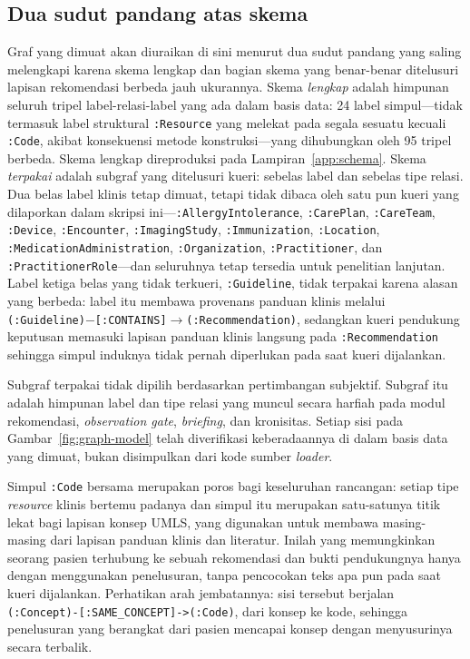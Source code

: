 \subsection{Dua sudut pandang atas skema}
Graf yang dimuat akan diuraikan di sini menurut dua sudut pandang yang saling melengkapi karena skema
lengkap dan bagian skema yang benar-benar ditelusuri lapisan rekomendasi berbeda jauh
ukurannya. Skema \emph{lengkap} adalah himpunan seluruh tripel label-relasi-label yang ada
dalam basis data: 24 label simpul---tidak termasuk label struktural \texttt{:Resource} yang
melekat pada segala sesuatu kecuali \texttt{:Code}, akibat konsekuensi metode konstruksi---yang dihubungkan
oleh 95 tripel berbeda. Skema lengkap direproduksi pada Lampiran~\ref{app:schema}. Skema
\emph{terpakai} adalah subgraf yang ditelusuri kueri: sebelas label dan sebelas tipe relasi. Dua belas
label klinis tetap dimuat, tetapi tidak dibaca oleh satu pun kueri yang dilaporkan dalam
skripsi ini---\texttt{:AllergyIntolerance}, \texttt{:CarePlan}, \texttt{:CareTeam},
\texttt{:Device}, \texttt{:Encounter}, \texttt{:ImagingStudy}, \texttt{:Immunization},
\texttt{:Location}, \texttt{:MedicationAdministration}, \texttt{:Organization},
\texttt{:Practitioner}, dan \texttt{:PractitionerRole}---dan seluruhnya tetap tersedia untuk
penelitian lanjutan. Label ketiga belas yang tidak terkueri, \texttt{:Guideline}, tidak
terpakai karena alasan yang berbeda: label itu membawa provenans panduan klinis melalui
\texttt{(:Guideline)$-$[:CONTAINS]$\rightarrow$(:Recommendation)}, sedangkan kueri pendukung
keputusan memasuki lapisan panduan klinis langsung pada \texttt{:Recommendation} sehingga simpul
induknya tidak pernah diperlukan pada saat kueri dijalankan.

Subgraf terpakai tidak dipilih berdasarkan pertimbangan subjektif. Subgraf itu adalah himpunan
label dan tipe relasi yang muncul secara harfiah pada modul rekomendasi,
\emph{observation gate}, \emph{briefing}, dan kronisitas. Setiap sisi pada Gambar~\ref{fig:graph-model} telah diverifikasi keberadaannya di dalam basis data yang dimuat,
bukan disimpulkan dari kode sumber \emph{loader}.

Simpul \texttt{:Code} bersama merupakan poros bagi keseluruhan rancangan: setiap tipe \emph{resource}
klinis bertemu padanya dan simpul itu merupakan satu-satunya titik lekat bagi lapisan konsep
UMLS, yang digunakan untuk membawa masing-masing dari lapisan panduan klinis dan literatur. Inilah yang memungkinkan
seorang pasien terhubung ke sebuah rekomendasi dan bukti pendukungnya hanya dengan menggunakan
penelusuran, tanpa pencocokan teks apa pun pada saat kueri dijalankan. Perhatikan arah
jembatannya: sisi tersebut berjalan
\texttt{(:Concept)-[:SAME\_CONCEPT]->(:Code)}, dari konsep ke kode, sehingga penelusuran yang
berangkat dari pasien mencapai konsep dengan menyusurinya secara terbalik.

